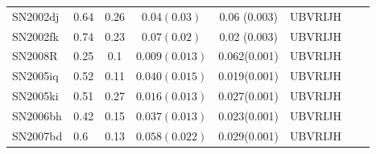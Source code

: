 \begin{table*}
\begin{center}
\begin{tabular}{llcccrrr}
SN2002dj	&	0.64	&	0.26		&	$   0.04 (0.03)$ & 0.06 (0.003)		& UBVRIJH		\\
SN2002fk	&	0.74	&	0.23		&	$0.07 (0.02)$   & 0.02 (0.003)		& UBVRIJH 				\\
SN2008R		&	0.25	&	0.1		&  $0.009(0.013)$ & 0.062(0.001)          & 	UBVRIJH		\\
SN2005iq	&	0.52	&	0.11		& $0.040(0.015)$ & 0.019(0.001) & UBVRIJH	\\	
SN2005ki	&	0.51	&	0.27		& $0.016(0.013)$ & 0.027(0.001) & UBVRIJH	\\
SN2006bh	&	0.42	&	0.15		& $0.037(0.013)$ & 0.023(0.001) & UBVRIJH	\\
SN2007bd	&	0.6	&	0.13		&  $0.058(0.022)$ & 0.029(0.001)        & UBVRIJH	\\
\hline
\end{tabular}
\label{tab:mni}
\end{center}
\end{table*}
